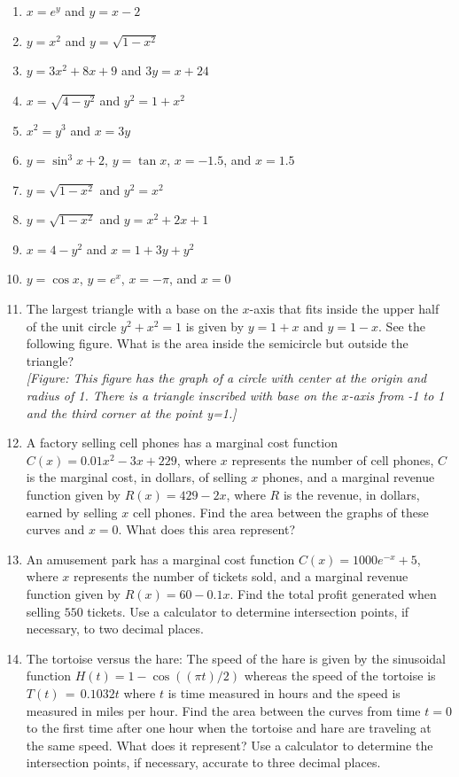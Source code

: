 \documentclass{exercises}
\begin{document}
\begin{enumerate}[resume]
\item \techrequired $x=e^{y}$ and $y=x-2$
\item \techrequired $y=x^{2}$ and $y=\sqrt{1-x^{2}}$
\item \techrequired $y=3x^{2}+8x+9$ and $3y=x+24$
\item \techrequired $x=\sqrt{4-y^{2}}$ and $y^{2}=1+x^{2}$
\item \techrequired $x^{2}=y^{3}$ and $x=3y$
\item \techrequired $y=\sin^{3}x+2$, $y=\tan x$, $x=-1.5$, and $x=1.5$
\item \techrequired $y=\sqrt{1-x^{2}}$ and $y^{2}=x^{2}$
\item \techrequired $y=\sqrt{1-x^{2}}$ and $y=x^{2}+2x+1$
\item \techrequired $x=4-y^{2}$ and $x=1+3y+y^{2}$
\item \techrequired $y=\cos x$, $y=e^{x}$, $x=-\pi$, and $x=0$
\item The largest triangle with a base on the $x$-axis that fits inside the upper half of the unit circle $y^{2}+x^{2}=1$ is given by $y=1+x$ and $y=1-x$. See the following figure. What is the area inside the semicircle but outside the triangle? \\ \textit{[Figure: This figure has the graph of a circle with center at the origin and radius of 1. There is a triangle inscribed with base on the $x$-axis from -1 to 1 and the third corner at the point y=1.]}
\item A factory selling cell phones has a marginal cost function $C(x)=0.01x^{2}-3x+229$, where $x$ represents the number of cell phones, $C$ is the marginal cost, in dollars, of selling $x$ phones, and a marginal revenue function given by $R(x)=429-2x$, where $R$ is the revenue, in dollars, earned by selling $x$ cell phones. Find the area between the graphs of these curves and $x=0$. What does this area represent?
\item An amusement park has a marginal cost function $C(x)=1000e^{-x}+5$, where $x$ represents the number of tickets sold, and a marginal revenue function given by $R(x)=60-0.1x$. Find the total profit generated when selling $550$ tickets. Use a calculator to determine intersection points, if necessary, to two decimal places.
\item The tortoise versus the hare: The speed of the hare is given by the sinusoidal function $H(t)=1-\cos((\pi t)/2)$ whereas the speed of the tortoise is $T(t)\,=\,0.1032t$ where $t$ is time measured in hours and the speed is measured in miles per hour. Find the area between the curves from time $t=0$ to the first time after one hour when the tortoise and hare are traveling at the same speed. What does it represent? Use a calculator to determine the intersection points, if necessary, accurate to three decimal places.

\end{enumerate}
\end{document}
